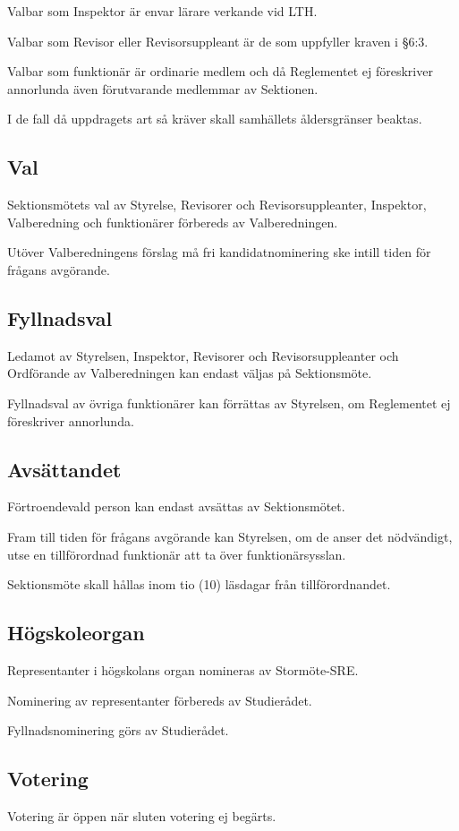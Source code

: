 \documentclass[10pt]{article}
\begin{document}
Valbar som Inspektor är envar lärare verkande vid LTH.

Valbar som Revisor eller Revisorsuppleant är de som uppfyller kraven i §6:3.

Valbar som funktionär är ordinarie medlem och då Reglementet ej föreskriver
annorlunda även förutvarande medlemmar av Sektionen.

I de fall då uppdragets art så kräver skall samhällets åldersgränser beaktas.

\subsection{Val}
Sektionsmötets val av Styrelse, Revisorer och
Revisorsuppleanter, Inspektor, Valberedning och funktionärer förbereds av
Valberedningen.

Utöver Valberedningens förslag må fri kandidatnominering ske intill tiden
för frågans avgörande.

\subsection{Fyllnadsval}
Ledamot av Styrelsen, Inspektor, Revisorer och Revisorsuppleanter och
Ordförande av Valberedningen kan endast väljas på
Sektionsmöte.

Fyllnadsval av övriga funktionärer kan förrättas av Styrelsen, om
Reglementet ej föreskriver annorlunda.

\subsection{Avsättandet}
Förtroendevald person kan endast avsättas av Sektionsmötet.

Fram till tiden för frågans avgörande kan Styrelsen, om de anser det
nödvändigt, utse en tillförordnad funktionär att ta över funktionärsysslan.

Sektionsmöte skall hållas inom tio (10) läsdagar från tillförordnandet.

\subsection{Högskoleorgan}
Representanter i högskolans organ nomineras av Stormöte-SRE.

Nominering av representanter förbereds av Studierådet.

Fyllnadsnominering görs av Studierådet.

\subsection{Votering}
Votering är öppen när sluten votering ej begärts.
\end{document}
